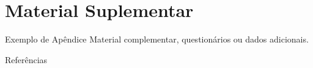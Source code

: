 \documentclass[aspectratio=169]{beamer}
\begin{document}
\appendix
\renewcommand{\thesection}{Apêndice \Alph{section}}

\section{Material Suplementar}

\begin{frame}{Exemplo de Apêndice}\label{sec:apendiceA}
Material complementar, questionários ou dados adicionais.
\end{frame}

\begin{frame}[allowframebreaks]{Referências}
\printbibliography[heading=none]
\end{frame}
\end{document}
